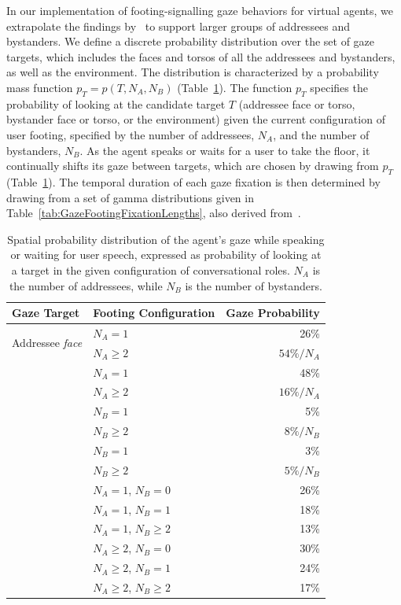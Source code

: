 In our implementation of footing-signalling gaze behaviors for virtual agents, we extrapolate the findings by~\citet{mutlu2012conversational} to support larger groups of addressees and bystanders. We define a discrete probability distribution over the set of gaze targets, which includes the faces and torsos of all the addressees and bystanders, as well as the environment. The distribution is characterized by a probability mass function $p_T = p(T, N_A, N_B)$ (Table~\ref{tab:GazeFootingSpatial}). The function $p_T$ specifies the probability of looking at the candidate target $T$ (addressee face or torso, bystander face or torso, or the environment) given the current configuration of user footing, specified by the number of addressees, $N_A$, and the number of bystanders, $N_B$. As the agent speaks or waits for a user to take the floor, it continually shifts its gaze between targets, which are chosen by drawing from $p_T$ (Table~\ref{tab:GazeFootingSpatial}). The temporal duration of each gaze fixation is then determined by drawing from a set of gamma distributions given in Table~\ref{tab:GazeFootingFixationLengths}, also derived from~\citet{mutlu2012conversational}.

\begin{table}
\centering
\def\arraystretch{1.5}
\begin{tabular}{|l|l|r|}
\hline
\textbf{Gaze Target} & \textbf{Footing Configuration} & \textbf{Gaze Probability} \\
\hline
\multirow{2}{*}{Addressee \emph{face}} & $N_A = 1$ & 26\% \\
& $N_A \geq 2$ & $54\%/N_A$ \\
\hdashline
\multirow{2}{*}{Addressee \emph{torso}} & $N_A = 1$ & 48\% \\
& $N_A \geq 2$ & $16\%/N_A$ \\
\hdashline
\multirow{2}{*}{Bystander \emph{face}} & $N_B = 1$ & 5\% \\
& $N_B \geq 2$ & $8\%/N_B$ \\
\hdashline
\multirow{2}{*}{Bystander \emph{torso}} & $N_B = 1$ & 3\% \\
& $N_B \geq 2$ & $5\%/N_B$ \\
\hdashline
\multirow{6}{*}{Environment} & $N_A = 1$, $N_B = 0$ & 26\% \\
& $N_A = 1$, $N_B = 1$ & 18\% \\
& $N_A = 1$, $N_B \geq 2$ & 13\% \\
& $N_A \geq 2$, $N_B = 0$ & 30\% \\
& $N_A \geq 2$, $N_B = 1$ & 24\% \\
& $N_A \geq 2$, $N_B \geq 2$ & 17\% \\
\hline
\end{tabular}
\caption{Spatial probability distribution of the agent's gaze while speaking or waiting for user speech, expressed as probability of looking at a target in the given configuration of conversational roles. $N_A$ is the number of addressees, while $N_B$ is the number of bystanders.}
\label{tab:GazeFootingSpatial}
\end{table}

